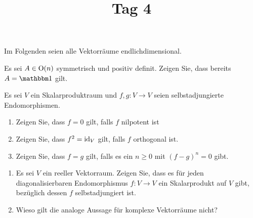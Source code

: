 \documentclass[a4paper, 10pt]{scrartcl}
\title{Tag 4}
\author{}
\date{}
\begin{document}
Im Folgenden seien alle Vektorräume endlichdimensional.





\begin{question}[subtitle = Symmetrisch und Orthogonal]
  Es sei $A \in \operatorname{O}(n)$ symmetrisch und positiv definit.
  Zeigen Sie, dass bereits $A = \Id$ gilt.
\end{question}





\begin{question}[subtitle = Selbstadjungierte Endomorphismen]
  Es sei $V$ ein Skalarproduktraum und $f, g \colon V \to V$ seien selbstadjungierte Endomorphismen.
  \begin{enumerate}
    \item
      Zeigen Sie, dass $f = 0$ gilt, falls $f$ nilpotent ist
    \item
      Zeigen Sie, dass $f^2 = \operatorname{id}_V$ gilt, falls $f$ orthogonal ist.
    \item
      Zeigen Sie, dass $f = g$ gilt, falls es ein $n \geq 0$ mit $(f-g)^n = 0$ gibt.
  \end{enumerate}
\end{question}





\begin{question}[subtitle = Diagonalisierbarkeit und Selbstadjungiertheit]
  \begin{enumerate}
    \item
      Es sei $V$ ein reeller Vektorraum.
      Zeigen Sie, dass es für jeden diagonalisierbaren Endomorphismus $f \colon V \to V$ ein Skalarprodukt auf $V$ gibt, bezüglich dessen $f$ selbstadjungiert ist.
    \item
      Wieso gilt die analoge Aussage für komplexe Vektorräume nicht?
  \end{enumerate}
\end{question}
\end{document}
